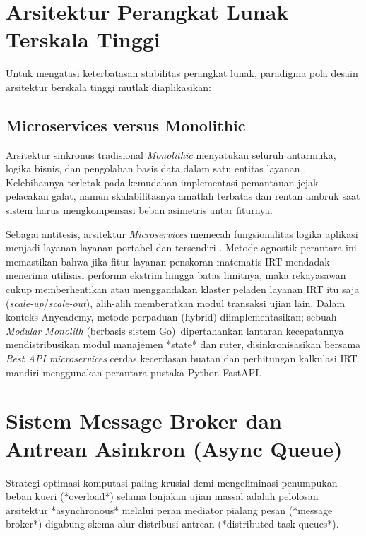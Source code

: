 \section{Arsitektur Perangkat Lunak Terskala Tinggi}

Untuk mengatasi keterbatasan stabilitas perangkat lunak, paradigma pola desain arsitektur berskala tinggi mutlak diaplikasikan:

\subsection{Microservices versus Monolithic}

Arsitektur sinkronus tradisional \textit{Monolithic} menyatukan seluruh antarmuka, logika bisnis, dan pengolahan basis data dalam satu entitas layanan \citep{Newman2015}. Kelebihannya terletak pada kemudahan implementasi pemantauan jejak pelacakan galat, namun skalabilitasnya amatlah terbatas dan rentan ambruk saat sistem harus mengkompensasi beban asimetris antar fiturnya.

Sebagai antitesis, arsitektur \textit{Microservices} memecah fungsionalitas logika aplikasi menjadi layanan-layanan portabel dan tersendiri \citep{Newman2015}. Metode agnostik perantara ini memastikan bahwa jika fitur layanan penskoran matematis IRT mendadak menerima utilisasi performa ekstrim hingga batas limitnya, maka rekayasawan cukup memberhentikan atau menggandakan klaster peladen layanan IRT itu saja (\textit{scale-up}/\textit{scale-out}), alih-alih memberatkan modul transaksi ujian lain. Dalam konteks Anycademy, metode perpaduan (hybrid) diimplementasikan; sebuah \textit{Modular Monolith} (berbasis sistem Go)\ dipertahankan lantaran kecepatannya mendistribusikan modul manajemen *state* dan ruter, disinkronisasikan bersama \textit{Rest API microservices} cerdas kecerdasan buatan dan perhitungan kalkulasi IRT mandiri menggunakan perantara pustaka Python FastAPI.

\section{Sistem Message Broker dan Antrean Asinkron (Async Queue)}

Strategi optimasi komputasi paling krusial demi mengeliminasi penumpukan beban kueri (*overload*) selama lonjakan ujian massal adalah pelolosan arsitektur *asynchronous* melalui peran mediator pialang pesan (*message broker*) digabung skema alur distribusi antrean (*distributed task queues*).

